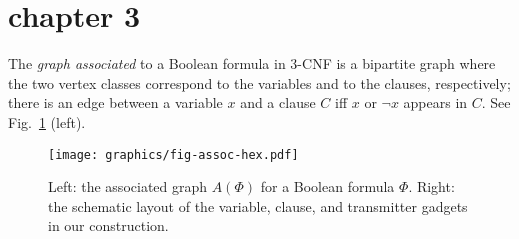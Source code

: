 \section{chapter 3}
The \emph{graph associated} to a Boolean formula in 3-CNF is a bipartite graph where the two vertex classes correspond to the variables and to the clauses, respectively; there is an edge between a variable $x$ and a clause $C$ iff $x$ or $\neg x$ appears in $C$. See Fig.~\ref{fig:assoc} (left).


\begin{figure}[!htbp]
	\centering
	\texttt{[image: graphics/fig-assoc-hex.pdf]}
	\caption[]{Left: the associated graph $A(\Phi)$ for a Boolean formula $\Phi$.
Right: the schematic layout of the variable, clause, and transmitter gadgets in our construction.}
	\label{fig:assoc}
\end{figure}